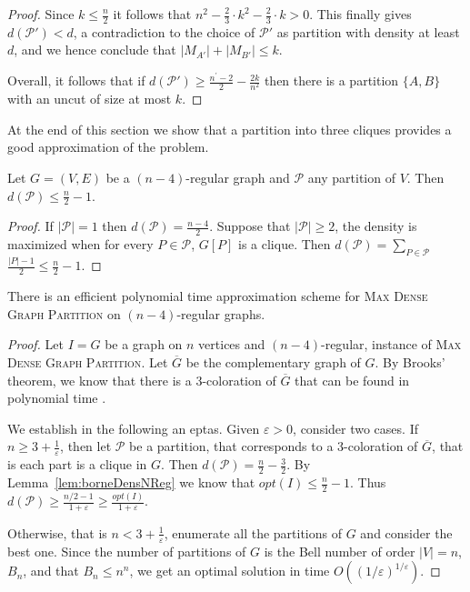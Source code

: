 \documentclass[a4paper,USenglish,cleveref, autoref]{lipics-v2021}
\newcommand\MDGP{\textsc{Max Dense Graph Partition}}
\begin{document}
\begin{proof}
Since $k \leq \frac{n}{2}$ it follows that $n^2 - \frac{2}{3}\cdot k^2 - \frac{2}{3}\cdot k > 0$. This finally gives $d(\mathcal{P'}) < d$, a contradiction to the choice of $\mathcal P'$ as partition with density at least $d$, and we hence conclude that $|{M}_{A'}| + |{M}_{B'}| \leq k$.

Overall, it follows that if $d(\mathcal{P'}) \geq \frac{n^{'}-2}{2} - \frac{2k}{n^2}$ then there is a partition $\{A,B\}$ with an uncut of size at most $k$.
\end{proof}

At the end of this section we show that a partition into three cliques provides a good approximation of the problem.

\begin{lemma}
\label{lem:borneDensNReg} Let $G=(V,E)$ be a $(n-4)$-regular graph and   $\mathcal{P}$ any partition of $V$. Then $d(\mathcal{P}) \leq \frac{n}{2} - 1$.
\end{lemma}
\begin{proof}
If $|\mathcal{P}| = 1$ then $d(\mathcal{P}) = \frac{n-4}{2}$. Suppose that $|\mathcal{P}| \geq 2$, the density is maximized when for every $P \in \mathcal{P}$, $G[P]$ is a clique. Then $d(\mathcal{P}) = \sum\limits_{P \in \mathcal{P}}$ $\frac{|P| - 1}{2} \leq \frac{n}{2} - 1$.
\end{proof}

\begin{theorem}
There is an efficient  polynomial time approximation scheme for \MDGP{} on $(n-4)$-regular graphs.
\end{theorem}
\begin{proof}
Let $I=G$  be a graph on $n$ vertices and $(n-4)$-regular, instance of \MDGP. Let $\overline{G}$ be the complementary graph of $G$. By Brooks' theorem, we know that there is a 3-coloration of $\overline{G}$ that can be found in polynomial time \cite{Karloff89}.  

We establish in the following an eptas. Given $\varepsilon>0$, consider two cases. If $n\geq 3+\frac{1}{\varepsilon}$, then
let $\mathcal{P}$ be a partition, that corresponds to a 3-coloration of $\overline{G}$,  that is each part is a clique in  $G$. Then $d(\mathcal{P}) = \frac{n}{2} - \frac{3}{2}$. By Lemma~\ref{lem:borneDensNReg} we know that $opt(I) \leq \frac{n}{2} - 1$. Thus $d(\mathcal{P}) \geq \frac{n/2-1}{1+\varepsilon}\geq \frac{opt(I)}{1+\varepsilon}$. 

Otherwise, that is 
$n < 3+\frac{1}{\varepsilon}$, enumerate all the partitions of $G$ and consider the best one. Since the number of partitions of $G$ is the Bell number of order $|V|=n$, $B_n$, and that $B_n\leq n^n$, we get an optimal solution in time $O((1/\varepsilon)^ {1/\varepsilon})$. \end{proof}
\end{document}
